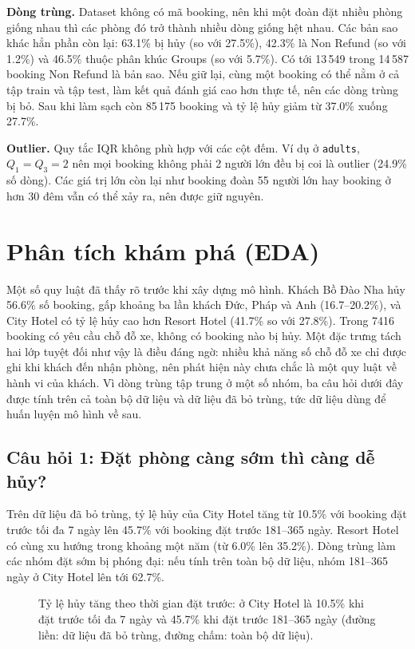 \textbf{Dòng trùng.} Dataset không có mã booking, nên khi một đoàn đặt nhiều phòng giống nhau thì các phòng đó trở thành
nhiều dòng giống hệt nhau. Các bản sao khác hẳn phần còn lại: 63.1\% bị hủy (so với 27.5\%), 42.3\% là Non Refund (so với 1.2\%)
và 46.5\% thuộc phân khúc Groups (so với 5.7\%). Có tới 13\,549 trong 14\,587 booking Non Refund là bản sao.
Nếu giữ lại, cùng một booking có thể nằm ở cả tập train và tập test, làm kết quả đánh giá cao hơn thực tế, nên các dòng trùng bị bỏ.
Sau khi làm sạch còn 85\,175 booking và tỷ lệ hủy giảm từ 37.0\% xuống 27.7\%.

\textbf{Outlier.} Quy tắc IQR không phù hợp với các cột đếm. Ví dụ ở \texttt{adults}, $Q_1 = Q_3 = 2$ nên mọi booking
không phải 2 người lớn đều bị coi là outlier (24.9\% số dòng). Các giá trị lớn còn lại như booking đoàn 55 người lớn
hay booking ở hơn 30 đêm vẫn có thể xảy ra, nên được giữ nguyên.

\section{Phân tích khám phá (EDA)}
Một số quy luật đã thấy rõ trước khi xây dựng mô hình. Khách Bồ Đào Nha hủy 56.6\% số booking, gấp khoảng ba lần khách Đức,
Pháp và Anh (16.7--20.2\%), và City Hotel có tỷ lệ hủy cao hơn Resort Hotel (41.7\% so với 27.8\%).
Trong 7416 booking có yêu cầu chỗ đỗ xe, không có booking nào bị hủy. Một đặc trưng tách hai lớp tuyệt đối như vậy là điều đáng ngờ:
nhiều khả năng số chỗ đỗ xe chỉ được ghi khi khách đến nhận phòng, nên phát hiện này chưa chắc là một quy luật về hành vi của khách.
Vì dòng trùng tập trung ở một số nhóm, ba câu hỏi dưới đây được tính trên cả toàn bộ dữ liệu và dữ liệu đã bỏ trùng,
tức dữ liệu dùng để huấn luyện mô hình về sau.

\subsection{Câu hỏi 1: Đặt phòng càng sớm thì càng dễ hủy?}
Trên dữ liệu đã bỏ trùng, tỷ lệ hủy của City Hotel tăng từ 10.5\% với booking đặt trước tối đa 7 ngày lên 45.7\%
với booking đặt trước 181--365 ngày. Resort Hotel có cùng xu hướng trong khoảng một năm (từ 6.0\% lên 35.2\%).
Dòng trùng làm các nhóm đặt sớm bị phóng đại: nếu tính trên toàn bộ dữ liệu, nhóm 181--365 ngày ở City Hotel lên tới 62.7\%.

\begin{figure}[H]
\centering
{}
\caption{Tỷ lệ hủy tăng theo thời gian đặt trước: ở City Hotel là 10.5\% khi đặt trước tối đa 7 ngày và 45.7\% khi đặt trước 181--365 ngày (đường liền: dữ liệu đã bỏ trùng, đường chấm: toàn bộ dữ liệu).}
\label{fig:tab-q1}
\end{figure}

